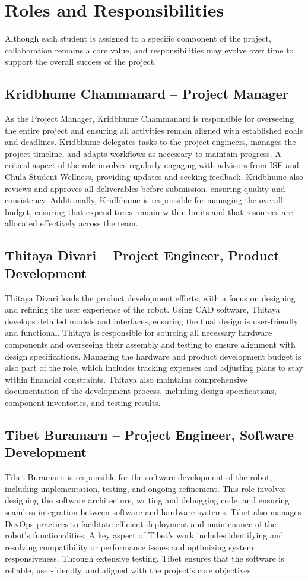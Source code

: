\section{Roles and Responsibilities}
Although each student is assigned to a specific component of the project, collaboration remains a core value, and responsibilities may evolve over time to support the overall success of the project.

\subsection*{Kridbhume Chammanard – Project Manager}
 As the Project Manager, Kridbhume Chammanard is responsible for overseeing the entire project and ensuring all activities remain aligned with established goals and deadlines. Kridbhume delegates tasks to the project engineers, manages the project timeline, and adapts workflows as necessary to maintain progress. A critical aspect of the role involves regularly engaging with advisors from ISE and Chula Student Wellness, providing updates and seeking feedback. Kridbhume also reviews and approves all deliverables before submission, ensuring quality and consistency. Additionally, Kridbhume is responsible for managing the overall budget, ensuring that expenditures remain within limits and that resources are allocated effectively across the team.

 \subsection*{Thitaya Divari – Project Engineer, Product Development}
 Thitaya Divari leads the product development efforts, with a focus on designing and refining the user experience of the robot. Using CAD software, Thitaya develops detailed models and interfaces, ensuring the final design is user-friendly and functional. Thitaya is responsible for sourcing all necessary hardware components and overseeing their assembly and testing to ensure alignment with design specifications. Managing the hardware and product development budget is also part of the role, which includes tracking expenses and adjusting plans to stay within financial constraints. Thitaya also maintains comprehensive documentation of the development process, including design specifications, component inventories, and testing results.

\subsection*{Tibet Buramarn – Project Engineer, Software Development}
 Tibet Buramarn is responsible for the software development of the robot, including implementation, testing, and ongoing refinement. This role involves designing the software architecture, writing and debugging code, and ensuring seamless integration between software and hardware systems. Tibet also manages DevOps practices to facilitate efficient deployment and maintenance of the robot’s functionalities. A key aspect of Tibet’s work includes identifying and resolving compatibility or performance issues and optimizing system responsiveness. Through extensive testing, Tibet ensures that the software is reliable, user-friendly, and aligned with the project’s core objectives.
